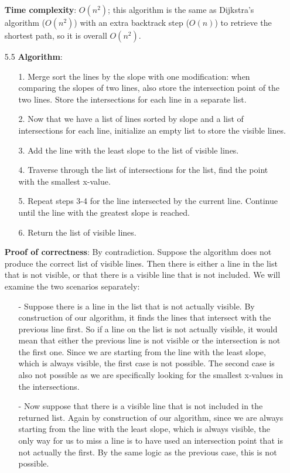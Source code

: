 \documentclass{article}
\begin{document}
\begin{itemize}
            \textbf{Time complexity}: $O(n^2)$; this algorithm is the same as Dijkstra's algorithm ($O(n^2)$) with an extra backtrack step ($O(n)$) to retrieve the shortest path, so it is overall $O(n^2)$.
      \item [5.5]
            \textbf{Algorithm}:
            \begin{itemize}
                  \item [1.] Merge sort the lines by the slope with one modification: when comparing the slopes of two lines, also store the intersection point of the two lines. Store the intersections for each line in a separate list.
                  \item [2.] Now that we have a list of lines sorted by slope and a list of intersections for each line, initialize an empty list to store the visible lines.
                  \item [3.] Add the line with the least slope to the list of visible lines.
                  \item [4.] Traverse through the list of intersections for the list, find the point with the smallest x-value.
                  \item [5.] Repeat steps 3-4 for the line intersected by the current line. Continue until the line with the greatest slope is reached.
                  \item [6.] Return the list of visible lines.
            \end{itemize}
            \textbf{Proof of correctness}: By contradiction. Suppose the algorithm does not produce the correct list of visible lines. Then there is either a line in the list that is not visible, or that there is a visible line that is not included. We will examine the two scenarios separately:
            \begin{itemize}
                  \item [-] Suppose there is a line in the list that is not actually visible. By construction of our algorithm, it finds the lines that intersect with the previous line first. So if a line on the list is not actually visible, it would mean that either the previous line is not visible or the intersection is not the first one. Since we are starting from the line with the least slope, which is always visible, the first case is not possible. The second case is also not possible as we are specifically looking for the smallest x-values in the intersections.
                  \item [-] Now suppose that there is a visible line that is not included in the returned list. Again by construction of our algorithm, since we are always starting from the line with the least slope, which is always visible, the only way for us to miss a line is to have used an intersection point that is not actually the first. By the same logic as the previous case, this is not possible.

\end{itemize}
\end{itemize}
\end{document}
